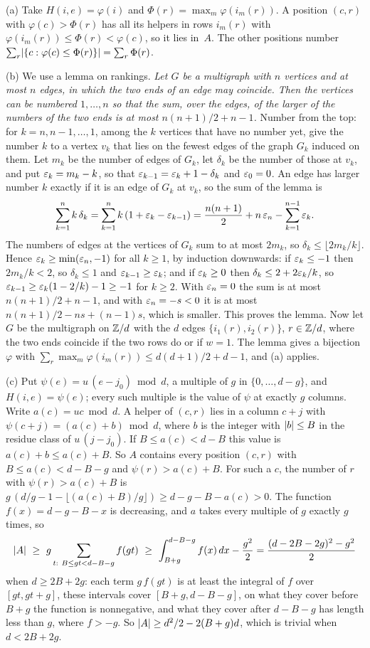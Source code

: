 \begin{informalproof}
(a) Take $H(i,e)=\varphi(i)$ and $\Phi(r)=\max_m\varphi(i_m(r))$. A position $(c,r)$ with $\varphi(c)>\Phi(r)$ has
all its helpers in rows $i_m(r)$ with $\varphi(i_m(r))\le\Phi(r)<\varphi(c)$, so it lies in~$A$. The other positions
number $\sum_r\lvert \{c:\varphi(c)\le\Phi(r)\} \rvert=\sum_r\Phi(r)$.

(b) We use a lemma on rankings. \emph{Let $G$ be a multigraph with $n$ vertices and at most $n$ edges, in which the
two ends of an edge may coincide. Then the vertices can be numbered $1,\dots,n$ so that the sum, over the edges, of
the larger of the numbers of the two ends is at most $n(n+1)/2+n-1$.} Number from the top: for $k=n,n-1,\dots,1$,
among the $k$ vertices that have no number yet, give the number $k$ to a vertex $v_k$ that lies on the fewest edges of
the graph $G_k$ induced on them. Let $m_k$ be the number of edges of $G_k$, let $\delta_k$ be the number of those at
$v_k$, and put $\varepsilon_k=m_k-k$, so that $\varepsilon_{k-1}=\varepsilon_k+1-\delta_k$ and $\varepsilon_0=0$. An edge has larger number $k$
exactly if it is an edge of $G_k$ at $v_k$, so the sum of the lemma is
\[
  \sum_{k=1}^nk\,\delta_k=\sum_{k=1}^nk\,(1+\varepsilon_k-\varepsilon_{k-1})=\frac{n(n+1)}2+n\,\varepsilon_n-\sum_{k=1}^{n-1}\varepsilon_k .
\]
The numbers of edges at the vertices of $G_k$ sum to at most $2m_k$, so $\delta_k\le\lfloor2m_k/k\rfloor$. Hence
$\varepsilon_k\ge\min(\varepsilon_n,-1)$ for all $k\ge1$, by induction downwards: if $\varepsilon_k\le-1$ then $2m_k/k<2$, so
$\delta_k\le1$ and $\varepsilon_{k-1}\ge\varepsilon_k$; and if $\varepsilon_k\ge0$ then $\delta_k\le2+2\varepsilon_k/k$, so
$\varepsilon_{k-1}\ge\varepsilon_k(1-2/k)-1\ge-1$ for $k\ge2$. With $\varepsilon_n=0$ the sum is at most $n(n+1)/2+n-1$, and with
$\varepsilon_n=-s<0$ it is at most $n(n+1)/2-ns+(n-1)s$, which is smaller. This proves the lemma. Now let $G$ be the
multigraph on $\mathbb{Z}/d$ with the $d$ edges $\{i_1(r),i_2(r)\}$, $r\in\mathbb{Z}/d$, where the two ends coincide if the two rows do
or if $w=1$. The lemma gives a bijection $\varphi$ with $\sum_r\max_m\varphi(i_m(r))\le d(d+1)/2+d-1$, and (a)
applies.

(c) Put $\psi(e)=u\,(e-j_0)\bmod d$, a multiple of $g$ in $\{0,\dots,d-g\}$, and $H(i,e)=\psi(e)$; every such
multiple is the value of $\psi$ at exactly $g$ columns. Write $a(c)=uc\bmod d$. A helper of $(c,r)$ lies in a column
$c+j$ with $\psi(c+j)=(a(c)+b)\bmod d$, where $b$ is the integer with $\lvert b \rvert\le B$ in the residue class of
$u\,(j-j_0)$. If $B\le a(c)<d-B$ this value is $a(c)+b\le a(c)+B$. So $A$ contains every position $(c,r)$ with
$B\le a(c)<d-B-g$ and $\psi(r)>a(c)+B$. For such a $c$, the number of $r$ with $\psi(r)>a(c)+B$ is
$g\,(d/g-1-\lfloor(a(c)+B)/g\rfloor)\ge d-g-B-a(c)>0$. The function $f(x)=d-g-B-x$ is decreasing, and $a$ takes every
multiple of $g$ exactly $g$ times, so
\[
  \card A\ \ge\ g\sum_{t:\ B\le gt<d-B-g}f(gt)\ \ge\ \int_{B+g}^{d-B-g}f(x)\,dx-\frac{g^2}2=\frac{(d-2B-2g)^2-g^2}2
\]
when $d\ge2B+2g$: each term $g\,f(gt)$ is at least the integral of $f$ over $[gt,gt+g]$, these intervals cover
$[B+g,d-B-g]$, on what they cover before $B+g$ the function is nonnegative, and what they cover after $d-B-g$ has
length less than $g$, where $f>-g$. So $\lvert A \rvert\ge d^2/2-2(B+g)d$, which is trivial when $d<2B+2g$.


\end{informalproof}
